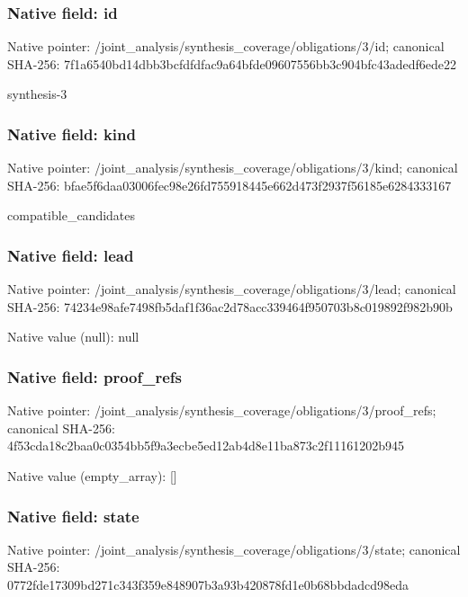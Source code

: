\documentclass[10pt,a4paper]{article}
\begin{document}
\subsubsection{Native field: id}
Native pointer: /joint\_\allowbreak{}analysis/synthesis\_\allowbreak{}coverage/obligations/3/id; canonical SHA-256: 7f1a6540bd14dbb3bcfdfdfac9a64bfde09607556bb3c904bfc43adedf6ede22

\begingroup\raggedright\sloppy synthesis-3\par\endgroup

\subsubsection{Native field: kind}
Native pointer: /joint\_\allowbreak{}analysis/synthesis\_\allowbreak{}coverage/obligations/3/kind; canonical SHA-256: bfae5f6daa03006fec98e26fd755918445e662d473f2937f56185e6284333167

\begingroup\raggedright\sloppy compatible\_\allowbreak{}candidates\par\endgroup

\subsubsection{Native field: lead}
Native pointer: /joint\_\allowbreak{}analysis/synthesis\_\allowbreak{}coverage/obligations/3/lead; canonical SHA-256: 74234e98afe7498fb5daf1f36ac2d78acc339464f950703b8c019892f982b90b

Native value (null): null

\subsubsection{Native field: proof\_\allowbreak{}refs}
Native pointer: /joint\_\allowbreak{}analysis/synthesis\_\allowbreak{}coverage/obligations/3/proof\_\allowbreak{}refs; canonical SHA-256: 4f53cda18c2baa0c0354bb5f9a3ecbe5ed12ab4d8e11ba873c2f11161202b945

Native value (empty\_\allowbreak{}array): []

\subsubsection{Native field: state}
Native pointer: /joint\_\allowbreak{}analysis/synthesis\_\allowbreak{}coverage/obligations/3/state; canonical SHA-256: 0772fde17309bd271c343f359e848907b3a93b420878fd1e0b68bbdadcd98eda
\end{document}
